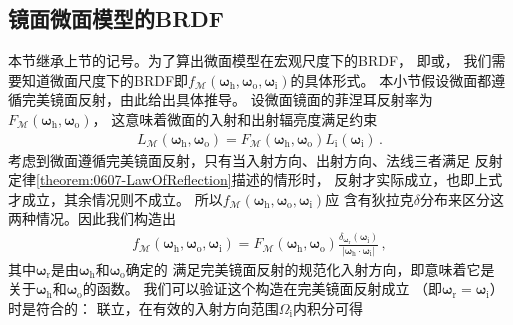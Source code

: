 \subsection{镜面微面模型的BRDF}\label{sub:镜面微面模型的BRDF}
本节继承上节的记号。为了算出微面模型在宏观尺度下的BRDF，
即或，
我们需要知道微面尺度下的BRDF即$f_{\mathcal{M}}({\bm\omega}_{\mathrm{h}},{\bm\omega}_{\mathrm{o}},{\bm\omega}_{\mathrm{i}})$的具体形式。
本小节假设微面都遵循完美镜面反射，由此给出具体推导。
设微面镜面的菲涅耳反射率为$F_{\mathcal{M}}({\bm\omega}_{\mathrm{h}},{\bm\omega}_{\mathrm{o}})$，
这意味着微面的入射和出射辐亮度满足约束
\begin{align}\label{eq:08ex01-FresnelMicrofacet}
    L_{\mathcal{M}}({\bm\omega}_{\mathrm{h}},{\bm\omega}_{\mathrm{o}})=F_{\mathcal{M}}({\bm\omega}_{\mathrm{h}},{\bm\omega}_{\mathrm{o}})L_{\mathrm{i}}({\bm\omega}_{\mathrm{i}})\, .
\end{align}
考虑到微面遵循完美镜面反射，只有当入射方向、出射方向、法线三者满足
反射定律\ref{theorem:0607-LawOfReflection}描述的情形时，
反射才实际成立，也即上式才成立，其余情况则不成立。
所以$f_{\mathcal{M}}({\bm\omega}_{\mathrm{h}},{\bm\omega}_{\mathrm{o}},{\bm\omega}_{\mathrm{i}})$应
含有狄拉克$\delta$分布来区分这两种情况。因此我们构造出
\begin{align}\label{eq:08ex01-FresnelBRDFMicrofacet}
    f_{\mathcal{M}}({\bm\omega}_{\mathrm{h}},{\bm\omega}_{\mathrm{o}},{\bm\omega}_{\mathrm{i}})
    =F_{\mathcal{M}}({\bm\omega}_{\mathrm{h}},{\bm\omega}_{\mathrm{o}})\frac{\delta_{{\bm\omega}_{\mathrm{r}}}({\bm\omega}_{\mathrm{i}})}{|{\bm\omega}_{\mathrm{h}}\cdot{\bm\omega}_{\mathrm{i}}|}\, ,
\end{align}
其中${\bm\omega}_{\mathrm{r}}$是由${\bm\omega}_{\mathrm{h}}$和${\bm\omega}_{\mathrm{o}}$确定的
满足完美镜面反射的规范化入射方向，即意味着它是
关于${\bm\omega}_{\mathrm{h}}$和${\bm\omega}_{\mathrm{o}}$的函数。
我们可以验证这个构造在完美镜面反射成立
（即${\bm\omega}_{\mathrm{r}}={\bm\omega}_{\mathrm{i}}$）时是符合的：
联立，在有效的入射方向范围${\varOmega}_{\mathrm{i}}$内积分可得
